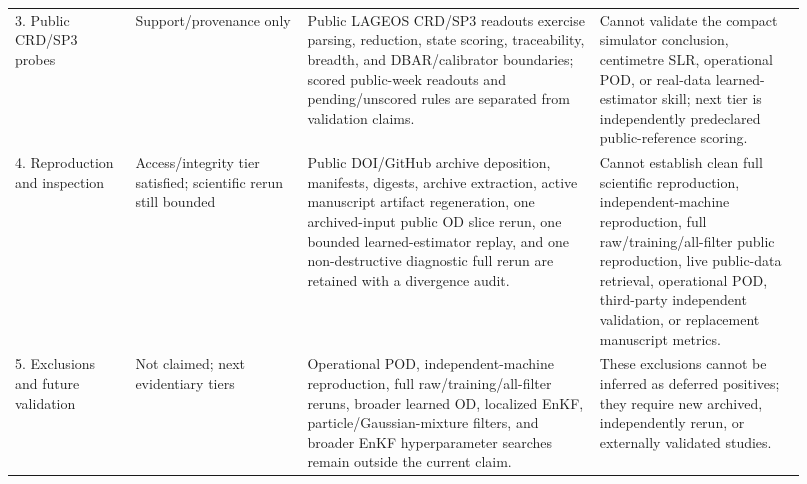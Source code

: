 \documentclass{article}
\begin{document}
\begin{table}[t]
\begin{tabular}{@{}p{0.14\linewidth}p{0.20\linewidth}p{0.34\linewidth}p{0.24\linewidth}@{}}
    3. Public CRD/SP3 probes & Support/provenance only & Public LAGEOS CRD/SP3 readouts exercise parsing, reduction, state scoring, traceability, breadth, and DBAR/calibrator boundaries; scored public-week readouts and pending/unscored rules are separated from validation claims. & Cannot validate the compact simulator conclusion, centimetre SLR, operational POD, or real-data learned-estimator skill; next tier is independently predeclared public-reference scoring. \\
    4. Reproduction and inspection & Access/integrity tier satisfied; scientific rerun still bounded & Public DOI/GitHub archive deposition, manifests, digests, archive extraction, active manuscript artifact regeneration, one archived-input public OD slice rerun, one bounded learned-estimator replay, and one non-destructive diagnostic full rerun are retained with a divergence audit. & Cannot establish clean full scientific reproduction, independent-machine reproduction, full raw/training/all-filter public reproduction, live public-data retrieval, operational POD, third-party independent validation, or replacement manuscript metrics. \\
    5. Exclusions and future validation & Not claimed; next evidentiary tiers & Operational POD, independent-machine reproduction, full raw/training/all-filter reruns, broader learned OD, localized EnKF, particle/Gaussian-mixture filters, and broader EnKF hyperparameter searches remain outside the current claim. & These exclusions cannot be inferred as deferred positives; they require new archived, independently rerun, or externally validated studies. \\
    \bottomrule
  \end{tabular}
  \endgroup
\end{table}
\end{document}
